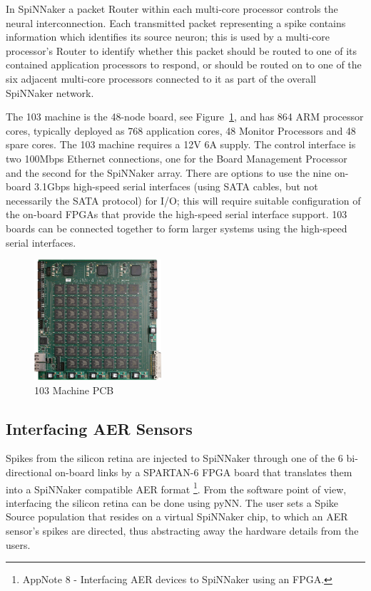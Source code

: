 \documentclass[journal]{journal}
\begin{document}
In SpiNNaker a packet Router within each multi-core processor controls the neural interconnection. 
Each transmitted packet representing a spike contains information which identifies its source neuron; 
this is used by a multi-core processor's Router to identify whether this packet should be routed to one of its contained application processors to respond, or should be routed on to one of the six adjacent multi-core processors connected to it as part of the overall SpiNNaker network.

The 103 machine is the 48-node board, see Figure~\ref{fig:48node}, and has 864 ARM processor cores, typically deployed as 768 application cores, 48 Monitor Processors and 48 spare cores. The 103 machine requires a 12V 6A supply. 
The control interface is two 100Mbps Ethernet connections, one for the Board Management Processor and the second for the SpiNNaker array. 
There are options to use the nine on-board 3.1Gbps high-speed serial interfaces (using SATA cables, but not necessarily the SATA protocol) for I/O; 
this will require suitable configuration of the on-board FPGAs that provide the high-speed serial interface support. 
103 boards can be connected together to form larger systems using the high-speed serial interfaces. 

\begin{figure}
\centering
	\includegraphics[width=0.42\textwidth]{pics/48node_pcb_resolution-white.pdf}
	\caption{103 Machine PCB}
	\label{fig:48node}
\end{figure}

\subsection{Interfacing AER Sensors}
Spikes from the silicon retina are injected to SpiNNaker through one of the 6 bi-directional on-board links by a SPARTAN-6 FPGA board that translates them into a SpiNNaker compatible AER format \footnote{AppNote 8 - Interfacing AER devices to SpiNNaker using an FPGA.}. 
From the software point of view, interfacing the silicon retina can be done using pyNN. 
The user sets a Spike Source population that resides on a virtual SpiNNaker chip, to which an AER sensor's spikes are directed, thus abstracting away the hardware details from the users\cite{galluppi2012real}.
\end{document}
